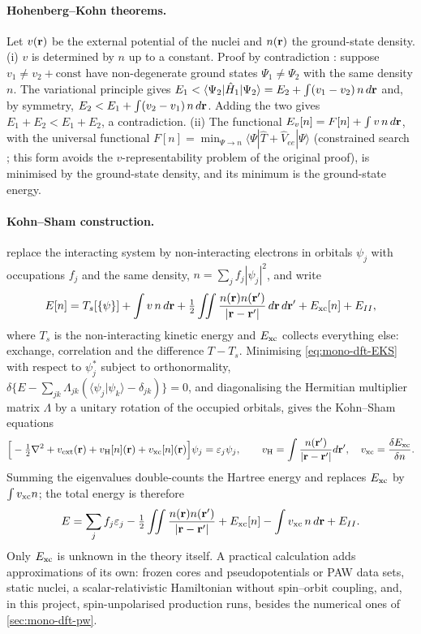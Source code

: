 \paragraph{Hohenberg--Kohn theorems.} Let $v(\mathbf{r})$ be the external potential of the nuclei and $n(\mathbf{r})$ the
ground-state density. (i) $v$ is determined by $n$ up to a constant. Proof by contradiction \citep{Hohenberg1964}:
suppose $v_1 \neq v_2 + \mathrm{const}$ have non-degenerate ground states $\Psi_1 \neq \Psi_2$ with the same density
$n$. The variational principle gives $E_1 < \langle\Psi_2|\hat{H}_1|\Psi_2\rangle = E_2 + \int (v_1-v_2)\,n\,d\mathbf{r}$ and, by
symmetry, $E_2 < E_1 + \int (v_2-v_1)\,n\,d\mathbf{r}$. Adding the two gives $E_1+E_2 < E_1+E_2$, a contradiction. (ii) The
functional $E_v[n] = F[n] + \int v\,n\,d\mathbf{r}$, with the universal functional $F[n] = \min_{\Psi\to n}\langle\Psi|\hat T +
\hat V_{ee}|\Psi\rangle$ (constrained search \citep{Levy1979,Lieb1983}; this form avoids the $v$-representability problem of the original
proof), is minimised by the ground-state density, and its minimum is the ground-state energy.

\paragraph{Kohn--Sham construction.} \citet{Kohn1965} replace the interacting system by non-interacting electrons in
orbitals $\psi_j$ with occupations $f_j$ and the same density, $n = \sum_j f_j|\psi_j|^2$, and write
\begin{equation}
E[n] = T_s[\{\psi\}] + \int v\,n\,d\mathbf{r} + \tfrac12\iint \frac{n(\mathbf{r})n(\mathbf{r}')}{|\mathbf{r}-\mathbf{r}'|}\,d\mathbf{r}\,d\mathbf{r}' + E_{\mathrm{xc}}[n] + E_{II},
\label{eq:mono-dft-EKS}
\end{equation}
where $T_s$ is the non-interacting kinetic energy and $E_{\mathrm{xc}}$ collects everything else: exchange, correlation and the
difference $T - T_s$. Minimising \cref{eq:mono-dft-EKS} with respect to $\psi_j^*$ subject to orthonormality,
$\delta\{E - \sum_{jk}\Lambda_{jk}(\langle\psi_j|\psi_k\rangle - \delta_{jk})\}=0$, and diagonalising the Hermitian
multiplier matrix $\Lambda$ by a unitary rotation of the occupied orbitals, gives the Kohn--Sham equations
\begin{equation}
\Big[-\tfrac12\nabla^2 + v_{\mathrm{ext}}(\mathbf{r}) + v_{\mathrm{H}}[n](\mathbf{r}) + v_{\mathrm{xc}}[n](\mathbf{r})\Big]\psi_j = \varepsilon_j\psi_j ,\qquad
v_{\mathrm{H}} = \int\frac{n(\mathbf{r}')}{|\mathbf{r}-\mathbf{r}'|}d\mathbf{r}' ,\quad v_{\mathrm{xc}} = \frac{\delta E_{\mathrm{xc}}}{\delta n} .
\label{eq:mono-dft-KS}
\end{equation}
Summing the eigenvalues double-counts the Hartree energy and replaces $E_{\mathrm{xc}}$ by $\int v_{\mathrm{xc}} n$; the total energy is
therefore
\begin{equation}
E = \sum_j f_j\varepsilon_j - \tfrac12\iint\frac{n(\mathbf{r})n(\mathbf{r}')}{|\mathbf{r}-\mathbf{r}'|} + E_{\mathrm{xc}}[n] - \int v_{\mathrm{xc}}\, n\,d\mathbf{r} + E_{II} .
\label{eq:mono-dft-Edc}
\end{equation}
Only $E_{\mathrm{xc}}$ is unknown in the theory itself. A practical calculation adds approximations of its own: frozen cores and
pseudopotentials or PAW data sets, static nuclei, a scalar-relativistic Hamiltonian without spin--orbit coupling, and, in
this project, spin-unpolarised production runs, besides the numerical ones of \cref{sec:mono-dft-pw}.

